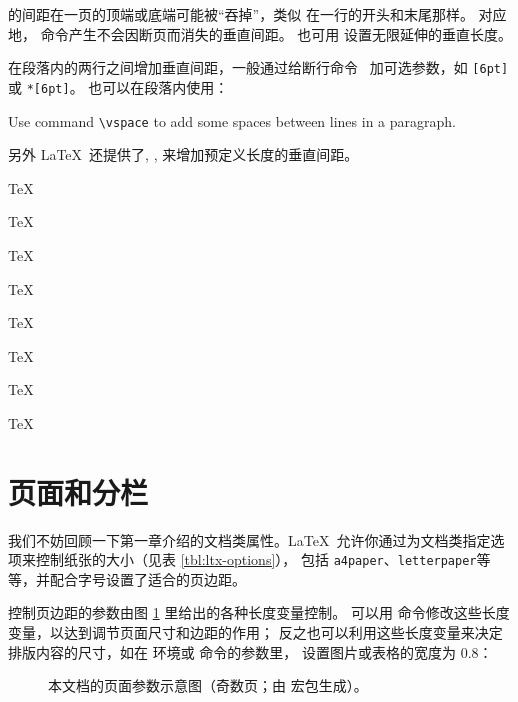  的间距在一页的顶端或底端可能被“吞掉”，类似  在一行的开头和末尾那样。
对应地， 命令产生不会因断页而消失的垂直间距。 也可用  设置无限延伸的垂直长度。

在段落内的两行之间增加垂直间距，一般通过给断行命令 \crcmd\ 加可选参数，如 \crcmd\texttt{[6pt]} 或 \crcmd\texttt{*[6pt]}。
 也可以在段落内使用：
\begin{example}
Use command \verb|\vspace| to
add \vspace{12pt} some spaces
between lines in a paragraph.
\end{example}

另外 \LaTeX\ 还提供了, ,  来增加预定义长度的垂直间距。
\begin{example}
\parbox[t]{3em}{TeX\par TeX}
\parbox[t]{3em}{TeX\par\smallskip TeX}
\parbox[t]{3em}{TeX\par\medskip TeX}
\parbox[t]{3em}{TeX\par\bigskip TeX}
\end{example}

\section{页面和分栏}\label{sec:page-columns}

我们不妨回顾一下第一章介绍的文档类属性。\LaTeX\ 允许你通过为文档类指定选项来控制纸张的大小（见表 \ref{tbl:ltx-options}），
包括 \texttt{a4paper}、\texttt{letterpaper}等等，并配合字号设置了适合的页边距。

控制页边距的参数由图 \ref{fig:layouts} 里给出的各种长度变量控制。
可以用  命令修改这些长度变量，以达到调节页面尺寸和边距的作用；
反之也可以利用这些长度变量来决定排版内容的尺寸，如在  环境或  命令的参数里，
设置图片或表格的宽度为 0.8：

\begin{figure}[!p]
\centering
\layoutpicture*
\caption{本文档的页面参数示意图（奇数页；由  宏包生成）。} \label{fig:layouts}
\end{figure}

